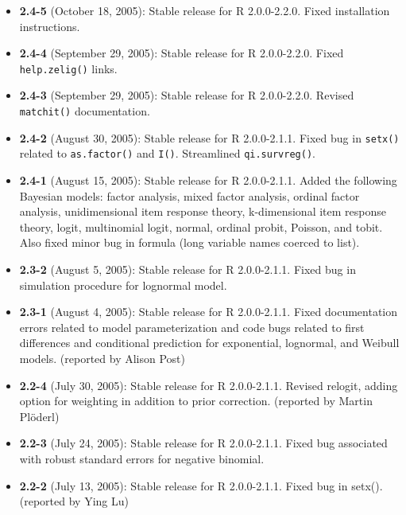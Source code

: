 \documentclass[oneside,letterpaper,12pt]{book}
\begin{document}
\begin{itemize}
\item \textbf{2.4-5} (October 18, 2005): Stable release for R 2.0.0-2.2.0.  
Fixed installation instructions.  

\item \textbf{2.4-4} (September 29, 2005): Stable release for R 
2.0.0-2.2.0.  Fixed {\tt help.zelig()} links.  

\item \textbf{2.4-3} (September 29, 2005): Stable release for R
2.0.0-2.2.0.  Revised {\tt matchit()} documentation.  

\item \textbf{2.4-2} (August 30, 2005): Stable release for R 2.0.0-2.1.1.  
  Fixed bug in {\tt setx()} related to {\tt as.factor()} and {\tt I()}.  
Streamlined {\tt qi.survreg()}.  

\item \textbf{2.4-1} (August 15, 2005): Stable release for R 2.0.0-2.1.1.  Added the
  following Bayesian models: factor analysis, mixed factor analysis,
  ordinal factor analysis, unidimensional item response theory,
  k-dimensional item response theory, logit, multinomial logit,
  normal, ordinal probit, Poisson, and tobit.  Also fixed minor bug in
formula (long variable names coerced to list).  

\item \textbf{2.3-2} (August 5, 2005): Stable release for R 2.0.0-2.1.1.  
Fixed bug in simulation procedure for lognormal model. 

\item \textbf{2.3-1} (August 4, 2005): Stable release for R 2.0.0-2.1.1.  
Fixed documentation errors related to model parameterization and code bugs 
related to first differences and conditional prediction for exponential, 
lognormal, and Weibull models.  (reported by Alison Post)

\item \textbf{2.2-4} (July 30, 2005):  Stable release for R
2.0.0-2.1.1.  Revised relogit, adding option for weighting in addition
to prior correction.  (reported by Martin Pl\"oderl)

\item \textbf{2.2-3} (July 24, 2005): Stable release for R 2.0.0-2.1.1.  
Fixed bug associated with robust standard errors for negative binomial.  

\item \textbf{2.2-2} (July 13, 2005): Stable release for R 2.0.0-2.1.1.  
Fixed bug in setx().  (reported by Ying Lu)


\end{itemize}
\end{document}
